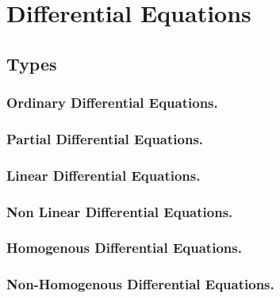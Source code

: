 \documentclass[12pt]{article}
\begin{document}
\section{Differential Equations}
\subsection{Types}
\subsubsection{Ordinary Differential Equations.}
\subsubsection{Partial Differential Equations.}
\subsubsection{Linear Differential Equations.}
\subsubsection{Non Linear Differential Equations.}
\subsubsection{Homogenous Differential Equations.}
\subsubsection{Non-Homogenous Differential Equations.}
\end{document}
